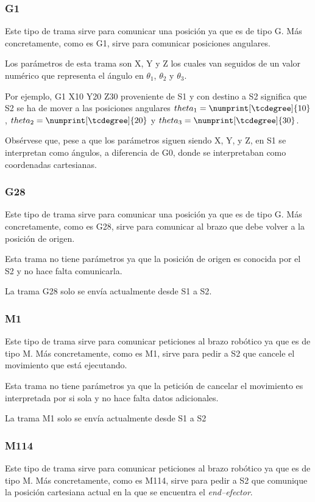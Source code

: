 \subsubsection{G1}
Este tipo de trama sirve para comunicar una posición ya que es de tipo G. Más concretamente, como es G1, sirve para comunicar posiciones angulares.

Los parámetros de esta trama son X, Y y Z los cuales van seguidos de un valor numérico que representa el ángulo en $\theta_{1}$, $\theta_{2}$ y $\theta_{3}$.

Por ejemplo, G1 X10 Y20 Z30 proveniente de \ac{S1} y con destino a \ac{S2} significa que \ac{S2} se ha de mover a las posiciones angulares $theta_1=\numprint[\tcdegree]{10}$, $theta_2=\numprint[\tcdegree]{20}$ y $theta_3=\numprint[\tcdegree]{30}$.

Obsérvese que, pese a que los parámetros siguen siendo X, Y, y Z, en S1 se interpretan como ángulos, a diferencia de G0, donde se interpretaban como coordenadas cartesianas.

\subsubsection{G28}
Este tipo de trama sirve para comunicar una posición ya que es de tipo G. Más concretamente, como es G28, sirve para comunicar al brazo que debe volver a la posición de origen.

Esta trama no tiene parámetros ya que la posición de origen es conocida por el \ac{S2} y no hace falta comunicarla.

La trama G28 solo se envía actualmente desde \ac{S1} a \ac{S2}.

\subsubsection{M1}
Este tipo de trama sirve para comunicar peticiones al brazo robótico ya que es de tipo M. Más concretamente, como es M1, sirve para pedir a \ac{S2} que cancele el movimiento que está ejecutando.

Esta trama no tiene parámetros ya que la petición de cancelar el movimiento es interpretada por si sola y no hace falta datos adicionales.

La trama M1 solo se envía actualmente desde \ac{S1} a \ac{S2}

\subsubsection{M114}
Este tipo de trama sirve para comunicar peticiones al brazo robótico ya que es de tipo M. Más concretamente, como es M114,
sirve para pedir a \ac{S2} que comunique la posición cartesiana actual en la que se encuentra el \textit{end--efector}.

